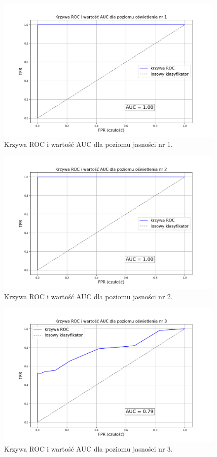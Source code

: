 \begin{figure}[H]
    \centering
    \includegraphics[width=\linewidth]{r_test_dokładności/AUC_charts/1.png}
    \caption{Krzywa ROC i wartość AUC dla poziomu jasności nr 1.}
    \label{fig:ROC-1}
\end{figure}

\begin{figure}[H]
    \centering
    \includegraphics[width=\linewidth]{r_test_dokładności/AUC_charts/2.png}
    \caption{Krzywa ROC i wartość AUC dla poziomu jasności nr 2.}
    \label{fig:ROC-2}
\end{figure}

\begin{figure}[H]
    \centering
    \includegraphics[width=\linewidth]{r_test_dokładności/AUC_charts/3.png}
    \caption{Krzywa ROC i wartość AUC dla poziomu jasności nr 3.}
    \label{fig:ROC-3}
\end{figure}

